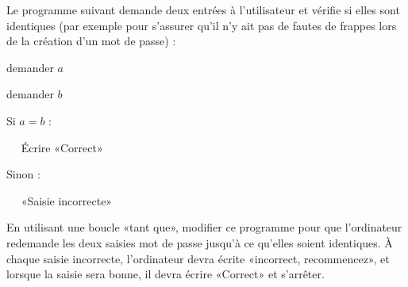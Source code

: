 
\begin{exercice}[\ldots/3]\label{exosmath-0703}

    Le programme suivant demande deux entrées à l'utilisateur et vérifie si elles sont identiques (par exemple pour s'assurer qu'il n'y ait pas de fautes de frappes lors de la création d'un mot de passe) :

    \begin{fmpage}{0.9\linewidth}

        demander \( a\)

        demander \( b\)

        Si \( a=b\) :

        ~~ Écrire «Correct» 

        Sinon :

        ~~ «Saisie incorrecte» 

    \end{fmpage}

    En utilisant une boucle «tant que», modifier ce programme pour que l'ordinateur redemande les deux saisies mot de passe jusqu'à ce qu'elles soient identiques. À chaque saisie incorrecte, l'ordinateur devra écrite «incorrect, recommencez», et lorsque la saisie sera bonne, il devra écrire «Correct» et s'arrêter.

\end{exercice}
